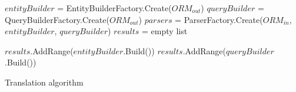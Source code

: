 \begin{algorithm}[!p]
    \footnotesize
    \DontPrintSemicolon

    

    $entityBuilder$ = EntityBuilderFactory.Create($ORM_{out}$)\;
    $queryBuilder$ = QueryBuilderFactory.Create($ORM_{out}$)\;
    $parsers$ = ParserFactory.Create($ORM_{in}$, $entityBuilder$, $queryBuilder$)\;
    $results$ = empty list\;
    

    $results$.AddRange($entityBuilder$.Build())\;
     {
        $results$.AddRange($queryBuilder$.Build())\;
    }
    
    \caption{Translation algorithm}
    \label{alg:translation_alg}
\end{algorithm}